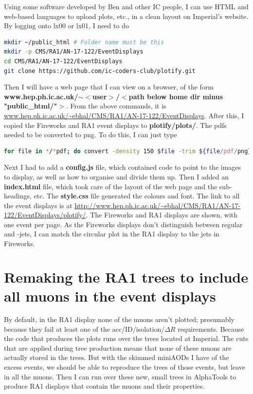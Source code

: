 Using some software developed by Ben and other IC people, I can use HTML and web-based languages to upload plots, etc., in a clean layout on Imperial's website. By logging onto lx00 or lx01, I need to do

\begin{lstlisting}[belowskip=-0.7cm, language=sh, numbers=none]
mkdir ~/public_html # Folder name must be this
mkdir -p CMS/RA1/AN-17-122/EventDisplays
cd CMS/RA1/AN-17-122/EventDisplays
git clone https://github.com/ic-coders-club/plotify.git
\end{lstlisting}

Then I will have a web page that I can view on a browser, of the form \textbf{www.hep.ph.ic.ac.uk/$\sim<$user$>$/$<$path below home dir minus "public\_html/"$>$}. From the above commands, it is \url{www.hep.ph.ic.ac.uk/~ebhal/CMS/RA1/AN-17-122/EventDisplays}. After this, I copied the Fireworks and RA1 event displays to \textbf{plotify/plots/}. The pdfs needed to be converted to png. To do this, I can just type

\begin{lstlisting}[belowskip=-0.7cm, language=sh, numbers=none]
for file in */*pdf; do convert -density 150 $file -trim ${file/pdf/png}; done
\end{lstlisting}

Next I had to add a \textbf{config.js} file, which contained code to point to the images to display, as well as how to organise and divide them up. Then I added an \textbf{index.html} file, which took care of the layout of the web page and the sub-headings, etc. The \textbf{style.css} file generated the colours and font. The link to all the event displays is at \url{http://www.hep.ph.ic.ac.uk/~ebhal/CMS/RA1/AN-17-122/EventDisplays/plotify/}. The Fireworks and RA1 displays are shown, with one event per page. As the Fireworks displays don't distinguish between regular and \Pqb-jets, I can match the circular plot in the RA1 display to the jets in Fireworks.

\section{Remaking the RA1 trees to include all muons in the event displays}

By default, in the RA1 display none of the muons aren't plotted; presumably because they fail at least one of the acc/ID/isolation/$\Delta R$ requirements. Because the code that produces the plots runs over the trees located at Imperial. The cuts that are applied during tree production means that none of these muons are actually stored in the trees. But with the skimmed miniAODs I have of the excess events, we should be able to reproduce the trees of those events, but leave in all the muons. Then I can run over these new, small trees in AlphaTools to produce RA1 displays that contain the muons and their properties.

